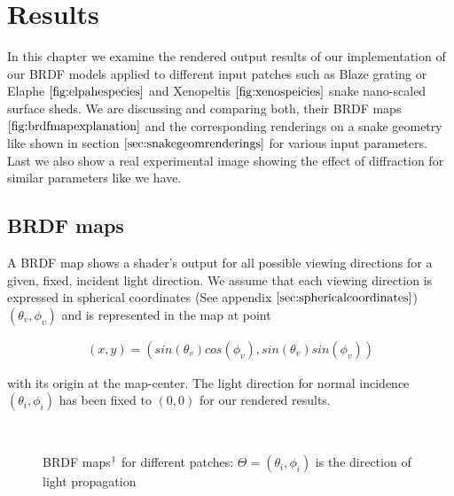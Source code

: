 \chapter{Results}
In this chapter we examine the rendered output results of our implementation of our BRDF models applied to different input patches such as Blaze grating or Elaphe $\ref{fig:elpahespecies}$ and Xenopeltis $\ref{fig:xenospeicies}$ snake nano-scaled surface sheds. We are discussing and comparing both, their BRDF maps $\ref{fig:brdfmapexplanation}$ and the corresponding renderings on a snake geometry like shown in section $\ref{sec:snakegeomrenderings}$ for various input parameters. Last we also show a real experimental image showing the effect of diffraction for similar parameters like we have.

\section{BRDF maps}
A BRDF map shows a shader's output for all possible viewing directions for a given, fixed, incident light direction. We assume that each viewing direction is expressed in spherical coordinates (See appendix $\ref{sec:sphericalcoordinates}$) $(\theta_v, \phi_v)$ and is represented in the map at point 

\begin{align}
(x,y) = (sin(\theta_v)cos(\phi_v), sin(\theta_v)sin(\phi_v))
\end{align}

with its origin at the map-center. The light direction for normal incidence $(\theta_i, \phi_i)$ has been fixed to $(0,0)$ for our rendered results.

\begin{figure}[H]
  \centering
~
~

\caption[BRDF Map]{BRDF maps$\footnotemark$ for different patches: $\Theta=(\theta_i,\phi_i)$ is the direction of light propagation}
\label{fig:brdfmapexplanation}
\end{figure}

